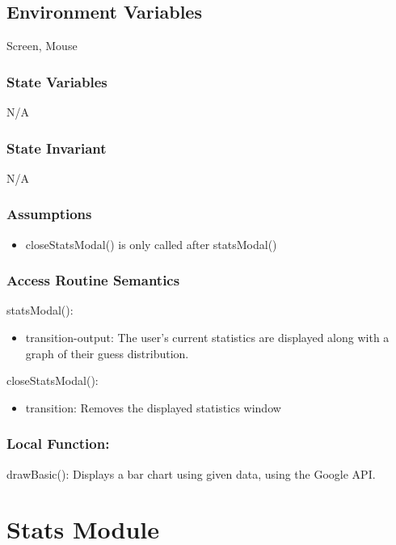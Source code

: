 \documentclass[12pt]{article}
\begin{document}
\subsection*{Environment Variables}

Screen, Mouse

\subsubsection* {State Variables}
N/A

\subsubsection* {State Invariant}

N/A

\subsubsection* {Assumptions}

\begin{itemize}
\item closeStatsModal() is only called after statsModal()
\end{itemize}

\subsubsection* {Access Routine Semantics}

\noindent statsModal():
\begin{itemize}
  \item transition-output: The user's current statistics are displayed along with a graph of their guess distribution.
\end{itemize}

\noindent closeStatsModal():
\begin{itemize}
\item transition: Removes the displayed statistics window
\end{itemize}

\subsubsection*{Local Function:}

drawBasic(): Displays a bar chart using given data, using the Google API.

\newpage

\section {Stats Module}
\end{document}
